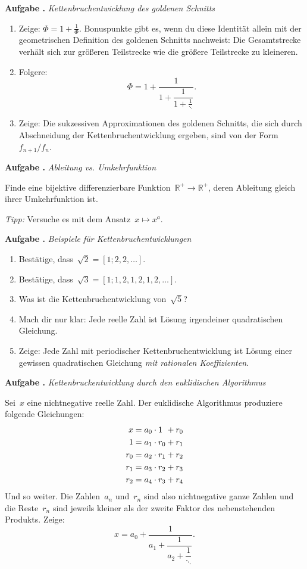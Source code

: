 \documentclass[a4paper,ngerman,twoside]{scrartcl}
\newlength{\aufgabenskip}
\newcounter{aufgabennummer}
\newenvironment{aufgabe}[1]{
  \addtocounter{aufgabennummer}{1}
  \textbf{Aufgabe \theaufgabennummer.} \emph{#1} \par
}{\vspace{\aufgabenskip}}
\newcommand{\RR}{\mathbb{R}}
\begin{document}
\begin{aufgabe}{Kettenbruchentwicklung des goldenen Schnitts}
\begin{enumerate}
\item Zeige: $\Phi = 1 + \frac{1}{\Phi}$. Bonuspunkte gibt es, wenn
du diese Identität allein mit der geometrischen Definition des goldenen
Schnitts nachweist: Die Gesamtstrecke verhält sich zur größeren Teilstrecke
wie die größere Teilstrecke zu kleineren.
\item Folgere:
\[ \Phi = 1 + \frac{1}{1 + \dfrac{1}{1 + \frac{1}{\ddots}}}. \]
\item Zeige: Die sukzessiven Approximationen des goldenen Schnitts, die sich
durch Abschneidung der Kettenbruchentwicklung ergeben, sind von der
Form~$f_{n+1}/f_n$.
\end{enumerate}
\end{aufgabe}

\begin{aufgabe}{Ableitung vs. Umkehrfunktion}
Finde eine bijektive differenzierbare Funktion~$\RR^+ \to \RR^+$, deren
Ableitung gleich ihrer Umkehrfunktion ist.

\emph{Tipp:} Versuche es mit dem Ansatz~$x \mapsto x^a$.
\end{aufgabe}

\begin{aufgabe}{Beispiele für Kettenbruchentwicklungen}
\begin{enumerate}
\item Bestätige, dass~$\sqrt{2} = [1; 2, 2, \ldots]$.
\item Bestätige, dass~$\sqrt{3} = [1; 1, 2, 1, 2, 1, 2, \ldots]$.
\item Was ist die Kettenbruchentwicklung von~$\sqrt{5}$?
\item Mach dir nur klar: Jede reelle Zahl ist Lösung irgendeiner quadratischen
Gleichung.
\item Zeige: Jede Zahl mit periodischer Kettenbruchentwicklung ist Lösung einer
gewissen quadratischen Gleichung \emph{mit rationalen Koeffizienten}.
\end{enumerate}
\end{aufgabe}

\begin{aufgabe}{Kettenbruckentwicklung durch den euklidischen Algorithmus}
Sei~$x$ eine nichtnegative reelle Zahl. Der euklidische Algorithmus produziere
folgende Gleichungen:
\begin{align*}
  x &= a_0 \cdot \sbox0{$r_0$}\makebox[\wd0][l]{$1$} + r_0 \\
  1 &= a_1 \cdot r_0 + r_1 \\
  r_0 &= a_2 \cdot r_1 + r_2 \\
  r_1 &= a_3 \cdot r_2 + r_3 \\
  r_2 &= a_4 \cdot r_3 + r_4
\end{align*}
Und so weiter. Die Zahlen~$a_n$ und~$r_n$ sind also nichtnegative ganze Zahlen
und die Reste~$r_n$ sind jeweils kleiner als der zweite Faktor des
nebenstehenden Produkts. Zeige:
\[ x = a_0 + \dfrac{1}{a_1 + \dfrac{1}{a_2 + \dfrac{1}{\ddots}}}. \]
\end{aufgabe}
\end{document}
